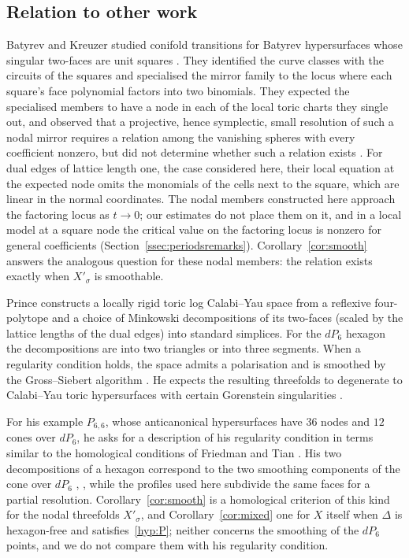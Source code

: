 \subsection{Relation to other work}
Batyrev and Kreuzer studied conifold transitions for Batyrev hypersurfaces whose singular two-faces are unit squares
\cite{BK10}. They identified the curve classes with the circuits of the squares and specialised the mirror family to
the locus where each square's face polynomial factors into two binomials. They expected the specialised members to have a node in each of
the local toric charts they single out, and observed that a projective, hence symplectic, small resolution of such a nodal
mirror requires a relation among the vanishing spheres with every coefficient nonzero, but did not determine whether
such a relation exists \cite[\S3]{BK10}. For dual edges of lattice length one, the case considered here, their
local equation at the expected node omits the monomials of the cells next to the square, which are linear in the normal coordinates.
The nodal members constructed here approach the factoring locus as $t\to0$; our estimates do not place them on it, and
in a local model at a square node the critical value on the factoring locus is nonzero for general coefficients
(Section~\ref{ssec:periodsremarks}). Corollary~\ref{cor:smooth} answers the
analogous question for these nodal members: the relation exists exactly when $X'_\sigma$ is smoothable.

Prince constructs a locally rigid toric log Calabi--Yau space from a reflexive four-polytope and a choice of Minkowski
decompositions of its two-faces (scaled by the lattice lengths of the dual edges) into standard simplices.
For the $dP_6$ hexagon the decompositions are into two triangles or into three segments. When a regularity condition
holds, the space admits a polarisation and is smoothed by the Gross--Siebert algorithm
\cite[\S1, Thm.~1.1, Rem.~1.2]{Prince}. He expects
the resulting threefolds to degenerate to Calabi--Yau toric hypersurfaces with certain Gorenstein singularities
\cite[Abstract]{Prince}.

For his example $P_{6,6}$, whose anticanonical hypersurfaces have $36$ nodes and $12$ cones over $dP_6$, he
asks for a description of his regularity condition in terms similar to the homological conditions of Friedman and
Tian \cite[Rem.~5.4]{Prince}. His two decompositions of a hexagon correspond to the two smoothing components of the
cone over $dP_6$ \cite[\S5]{Prince}, \cite[(8.1)]{Altmann97}, while the profiles used here subdivide the same faces for
a partial resolution. Corollary~\ref{cor:smooth} is a homological criterion of this kind for the nodal threefolds
$X'_\sigma$, and Corollary~\ref{cor:mixed} one for $X$ itself when $\Delta$ is hexagon-free and
satisfies~\ref{hyp:P}; neither concerns the smoothing of the $dP_6$ points, and we do not compare them with his
regularity condition.

